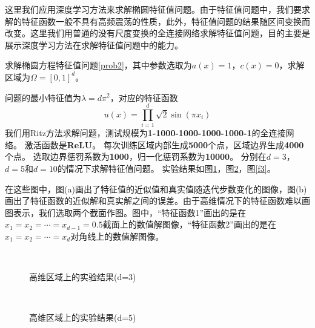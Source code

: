 

这里我们应用深度学习方法来求解椭圆特征值问题。由于特征值问题中，我们要求解的特征函数一般不具有高频震荡的性质，此外，特征值问题的结果随区间变换而改变。这里我们用普通的没有尺度变换的全连接网络求解特征值问题，目的主要是展示深度学习方法在求解特征值问题中的能力。


求解椭圆方程特征值问题\ref{prob2}，其中参数选取为$a(x)=1$，$c(x)=0$，求解区域为$\Omega = [0, 1]^d$。

问题的最小特征值为$\lambda = d \pi^2$，对应的特征函数
\begin{equation}
u(x) = \prod_{i=1}^{d} \sqrt{2} \sin(\pi x_i)
\end{equation}
我们用Ritz方法求解问题，测试规模为\textbf{1-1000-1000-1000-1000-1}的全连接网络。
激活函数是\textbf{ReLU}。
每次训练区域内部生成\textbf{5000}个点，区域边界生成\textbf{4000}个点。
选取边界惩罚系数为\textbf{1000}，归一化惩罚系数为\textbf{10000}。
分别在$d=3$，$d=5$和$d=10$的情况下求解特征值问题。
实验结果如图\ref{f1}，图\ref{f2}，图\ref{f3}。

在这些图中，图(a)画出了特征值的近似值和真实值随迭代步数变化的图像，图(b)画出了特征函数的近似解和真实解之间的误差。由于高维情况下的特征函数难以画图表示，我们选取两个截面作图。图中，“特征函数1”画出的是在$x_1 = x_2 = \cdots = x_{d-1} = 0.5$截面上的数值解图像，“特征函数2”画出的是在$x_1 = x_2 = \cdots = x_d$对角线上的数值解图像。

\begin{figure}[h]
\centering
{}
\\
\caption{高维区域上的实验结果(d=3)}
\label{f1}
\end{figure}

\begin{figure}[h]
\centering
{}
\\
\caption{高维区域上的实验结果(d=5)}
\label{f2}
\end{figure}

